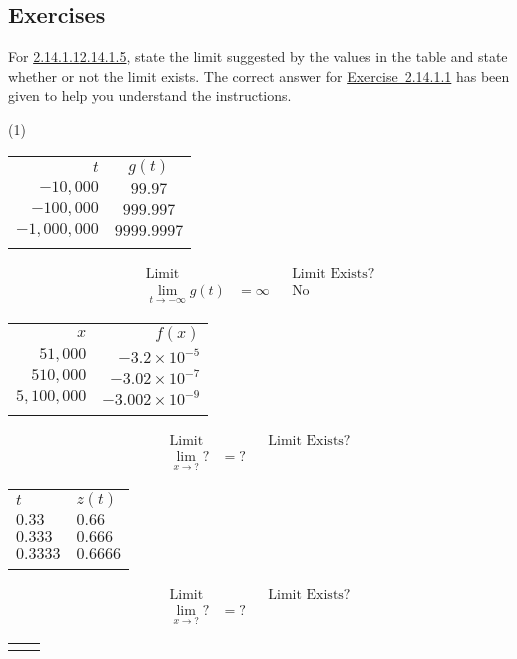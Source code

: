 \documentclass[12pt,]{book}
\theoremstyle{plain}
\theoremstyle{definition}
\theoremstyle{definition}
\theoremstyle{definition}
\theoremstyle{definition}
\theoremstyle{definition}
\numberwithin{equation}{section}
\newcommand{\hrulemedium}{\noalign{\hrule height 0.07em}}
\newcommand{\hrulethick} {\noalign{\hrule height 0.11em}}
\newcommand{\fe}[2]{#1\mathopen{}\left(#2\right)\mathclose{}}
\begin{document}
\subsection[{Exercises}]{Exercises}\label{exercises-18}
\hypertarget{exercisegroup-31}{}\par\noindent For \hyperlink{exercise-limits-supplement-first}{2.14.1.1}\textendash{}\hyperlink{exercise-limits-supplement-last}{2.14.1.5}, state the limit suggested by the values in the table and state whether or not the limit exists.  The correct answer for \hyperlink{exercise-limits-supplement-first}{Exercise~2.14.1.1} has been given to help you understand the instructions.%
\begin{exercisegroup}(1)
\exercise[1.]\hypertarget{exercise-limits-supplement-first}{}\begin{tabular}{rc}\hrulethick
\(t\)&\(\fe{g}{t}\)\tabularnewline\hrulemedium
\(-10{,}000\)&\(99.97\)\tabularnewline[0pt]
\(-100{,}000\)&\(999.997\)\tabularnewline[0pt]
\(-1{,}000{,}000\)&\(9999.9997\)\tabularnewline\hrulethick
\end{tabular}
\begin{align*}
\text{Limit}&&&\text{Limit Exists?}\\
\lim\limits_{t\to-\infty}\fe{g}{t}&=\infty&&\text{No}
\end{align*}%
\exercise[2.]\hypertarget{exercise-138}{}\begin{tabular}{rr}\hrulethick
\(x\)&\(\fe{f}{x}\)\tabularnewline\hrulemedium
\(51{,}000\)&\(-3.2\times10^{-5}\)\tabularnewline[0pt]
\(510{,}000\)&\(-3.02\times10^{-7}\)\tabularnewline[0pt]
\(5{,}100{,}000\)&\(-3.002\times10^{-9}\)\tabularnewline\hrulethick
\end{tabular}
\begin{align*}
\text{Limit}&&&\text{Limit Exists?}\\
\lim\limits_{x\to\mathord{?}}\mathord{?}&=\mathord{?}
\end{align*}%
\exercise[3.]\hypertarget{exercise-139}{}\begin{tabular}{ll}\hrulethick
\(t\)&\(\fe{z}{t}\)\tabularnewline\hrulemedium
\(0.33\)&\(0.66\)\tabularnewline[0pt]
\(0.333\)&\(0.666\)\tabularnewline[0pt]
\(0.3333\)&\(0.6666\)\tabularnewline\hrulethick
\end{tabular}
\begin{align*}
\text{Limit}&&&\text{Limit Exists?}\\
\lim\limits_{x\to\mathord{?}}\mathord{?}&=\mathord{?}
\end{align*}%
\exercise[4.]\hypertarget{exercise-140}{}\begin{tabular}{lc}\hrulethick

\end{tabular}
\end{exercisegroup}
\end{document}
